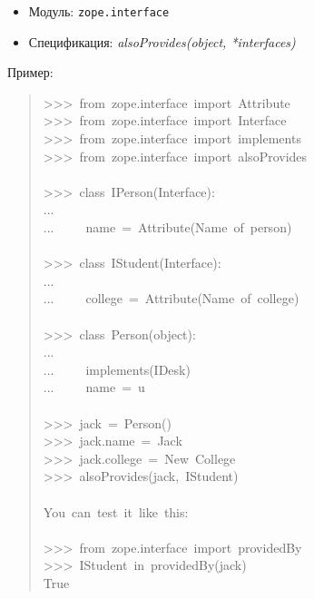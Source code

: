 \documentclass[14pt,a4paper,openany,twoside,final]{extbook}
\providecommand*{\DUroletitlereference}[1]{\textsl{#1}}
\begin{document}
\begin{itemize}

\item Модуль: \texttt{zope.interface}

\item Спецификация: \DUroletitlereference{alsoProvides(object, *interfaces)}

\end{itemize}

Пример:

\begin{quote}{\ttfamily \raggedright \noindent
>{}>{}>~from~zope.interface~import~Attribute\\
>{}>{}>~from~zope.interface~import~Interface\\
>{}>{}>~from~zope.interface~import~implements\\
>{}>{}>~from~zope.interface~import~alsoProvides\\
~\\
>{}>{}>~class~IPerson(Interface):\\
...\\
...~~~~~name~=~Attribute(\textquotedbl{}Name~of~person\textquotedbl{})\\
~\\
>{}>{}>~class~IStudent(Interface):\\
...\\
...~~~~~college~=~Attribute(\textquotedbl{}Name~of~college\textquotedbl{})\\
~\\
>{}>{}>~class~Person(object):\\
...\\
...~~~~~implements(IDesk)\\
...~~~~~name~=~u\textquotedbl{}\textquotedbl{}\\
~\\
>{}>{}>~jack~=~Person()\\
>{}>{}>~jack.name~=~\textquotedbl{}Jack\textquotedbl{}\\
>{}>{}>~jack.college~=~\textquotedbl{}New~College\textquotedbl{}\\
>{}>{}>~alsoProvides(jack,~IStudent)\\
~\\
You~can~test~it~like~this:\\
~\\
>{}>{}>~from~zope.interface~import~providedBy\\
>{}>{}>~IStudent~in~providedBy(jack)\\
True
}
\end{quote}
\end{document}
